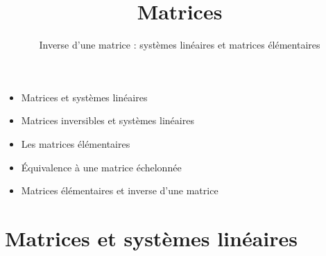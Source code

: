 



\newcommand{\mathinsist}{\onslide}



\title{{\bf Matrices}}
\subtitle{Inverse d'une matrice : systèmes linéaires et matrices élémentaires}

\begin{frame}
  
  \debutmontitre

  \pause

{\footnotesize
\hfill
{}
\begin{minipage}{0.6\textwidth}
  \begin{itemize}
    \item<3-> Matrices et systèmes linéaires
    \item<4-> Matrices inversibles et systèmes linéaires
    \item<5-> Les matrices élémentaires
    \item<6-> \'Equivalence à une matrice échelonnée
    \item<7-> Matrices élémentaires et inverse d'une matrice   
  \end{itemize}
\end{minipage}
}

\end{frame}

\setcounter{framenumber}{0}


\section{Matrices et systèmes linéaires}

